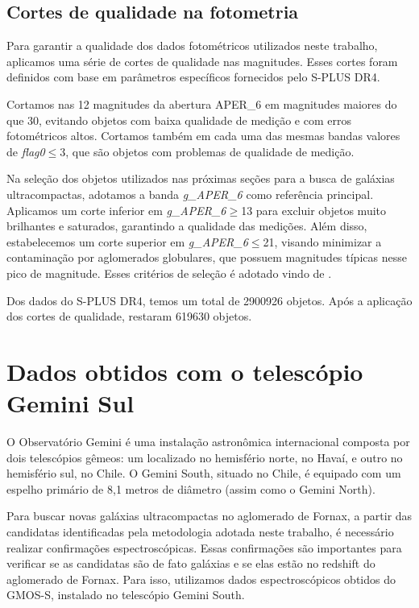 \subsection{Cortes de qualidade na fotometria}\label{subsec:cuts}
Para garantir a qualidade dos dados fotométricos utilizados neste trabalho, aplicamos uma série de cortes de qualidade nas magnitudes. Esses cortes foram definidos com base em parâmetros específicos fornecidos pelo S-PLUS DR4.

Cortamos nas 12 magnitudes da abertura APER\_6 em magnitudes maiores do que 30, evitando objetos com baixa qualidade de medição e com erros fotométricos altos. Cortamos também em cada uma das mesmas bandas valores de \textit{flag0}$\leq$3, que são objetos com problemas de qualidade de medição.

Na seleção dos objetos utilizados nas próximas seções para a busca de galáxias ultracompactas, adotamos a banda \textit{g\_APER\_6} como referência principal. Aplicamos um corte inferior em \textit{g\_APER\_6}$\geq$13 para excluir objetos muito brilhantes e saturados, garantindo a qualidade das medições. Além disso, estabelecemos um corte superior em \textit{g\_APER\_6}$\leq$21, visando minimizar a contaminação por aglomerados globulares, que possuem magnitudes típicas nesse pico de magnitude. Esses critérios de seleção é adotado vindo de \cite{Cantiello_2020}.

Dos dados do S-PLUS DR4, temos um total de 2900926 objetos. Após a aplicação dos cortes de qualidade, restaram 619630 objetos.

\section{Dados obtidos com o telescópio Gemini Sul}
O Observatório Gemini é uma instalação astronômica internacional composta por dois telescópios gêmeos: um localizado no hemisfério norte, no Havaí, e outro no hemisfério sul, no Chile. O Gemini South, situado no Chile, é equipado com um espelho primário de 8,1 metros de diâmetro (assim como o Gemini North).

Para buscar novas galáxias ultracompactas no aglomerado de Fornax, a partir das candidatas identificadas pela metodologia adotada neste trabalho, é necessário realizar confirmações espectroscópicas. Essas confirmações são importantes para verificar se as candidatas são de fato galáxias e se elas estão no redshift do aglomerado de Fornax. Para isso, utilizamos dados espectroscópicos obtidos do GMOS-S, instalado no telescópio Gemini South.

